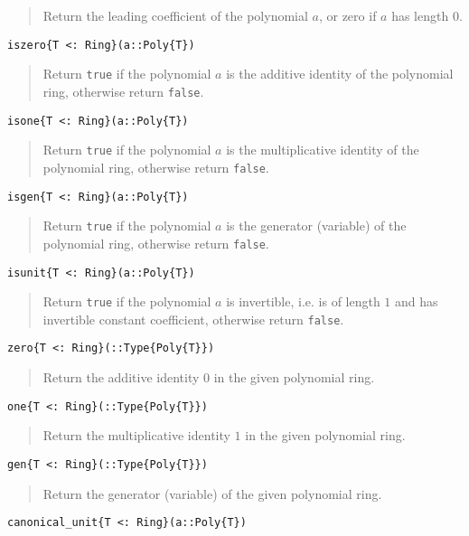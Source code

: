 \documentclass[a4paper,10pt]{article}
\newcommand{\code}{\lstinline}
\newcommand{\desc}[1]{\vspace{-3mm}\begin{quote}#1\end{quote}}
\begin{document}
\desc{Return the leading coefficient of the polynomial $a$, or zero if $a$ has
length $0$.}

\begin{lstlisting}
iszero{T <: Ring}(a::Poly{T})
\end{lstlisting}

\desc{Return \code{true} if the polynomial $a$ is the additive identity of the
polynomial ring, otherwise return \code{false}.}

\begin{lstlisting}
isone{T <: Ring}(a::Poly{T})
\end{lstlisting}

\desc{Return \code{true} if the polynomial $a$ is the multiplicative identity
of the polynomial ring, otherwise return \code{false}.}

\begin{lstlisting}
isgen{T <: Ring}(a::Poly{T})
\end{lstlisting}

\desc{Return \code{true} if the polynomial $a$ is the generator (variable) of the
polynomial ring, otherwise return \code{false}.}

\begin{lstlisting}
isunit{T <: Ring}(a::Poly{T})
\end{lstlisting}

\desc{Return \code{true} if the polynomial $a$ is invertible, i.e. is of length
$1$ and has invertible constant coefficient, otherwise return \code{false}.}

\begin{lstlisting}
zero{T <: Ring}(::Type{Poly{T}})
\end{lstlisting}

\desc{Return the additive identity $0$ in the given polynomial ring.}

\begin{lstlisting}
one{T <: Ring}(::Type{Poly{T}})
\end{lstlisting}

\desc{Return the multiplicative identity $1$ in the given polynomial ring.}

\begin{lstlisting}
gen{T <: Ring}(::Type{Poly{T}})
\end{lstlisting}

\desc{Return the generator (variable) of the given polynomial ring.}

\begin{lstlisting}
canonical_unit{T <: Ring}(a::Poly{T})
\end{lstlisting}
\end{document}
